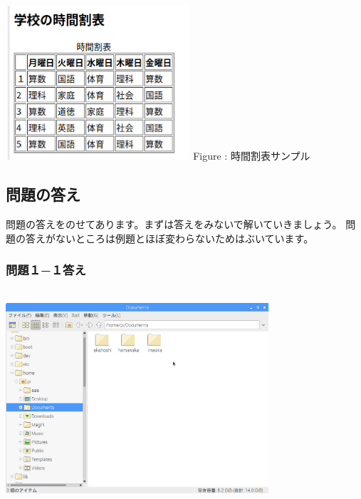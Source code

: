 \documentclass[a4paper,12pt]{jarticle}
\begin{document}
\begin{minipage}{6.839cm}
  {\upshape
    \includegraphics[width=6.839cm,height=5.727cm]{textbook-img211.png}
    \newline
    Figure {\theFigure\label{seq:refFigure45}}:
    時間割表サンプル}
\end{minipage}

\bigskip

\flushleft
\clearpage\subsection{\bfseries
  問題の答え}

問題の答えをのせてあります。まずは答えをみないで解いていきましょう。\newline
問題の答えがないところは例題とほぼ変わらないためはぶいています。

\subsubsection{\bfseries
  問題１−１答え}

\bigskip


\centering
\includegraphics[width=9.763cm,height=8.038cm]{textbook-img212.png}
\flushleft
\end{document}
